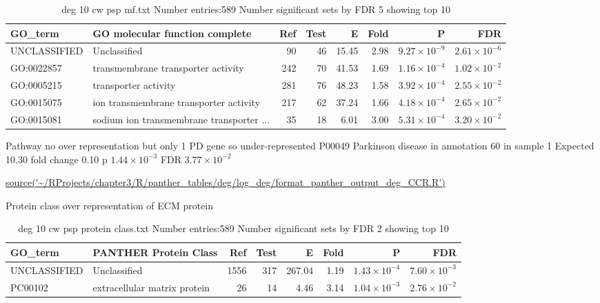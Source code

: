 \begin{table}[ht]
\centering
\begin{tabular}{llrrrrrr}
  \hline
GO\_term & GO molecular function complete & Ref & Test & E & Fold & P & FDR \\ 
  \hline
UNCLASSIFIED & Unclassified  & 90 & 46 & 15.45 & 2.98 & $9.27 \times 10^{-9}$ & $2.61 \times 10^{-6}$ \\ 
  GO:0022857 & transmembrane transporter activity  & 242 & 70 & 41.53 & 1.69 & $1.16 \times 10^{-4}$ & $1.02 \times 10^{-2}$ \\ 
  GO:0005215 & transporter activity  & 281 & 76 & 48.23 & 1.58 & $3.92 \times 10^{-4}$ & $2.55 \times 10^{-2}$ \\ 
  GO:0015075 & ion transmembrane transporter activity  & 217 & 62 & 37.24 & 1.66 & $4.18 \times 10^{-4}$ & $2.65 \times 10^{-2}$ \\ 
  GO:0015081 & sodium ion transmembrane transporter ... & 35 & 18 & 6.01 & 3.00 & $5.31 \times 10^{-4}$ & $3.20 \times 10^{-2}$ \\ 
  \hline
\end{tabular}
\caption{deg 10 cw psp mf.txt Number entries:589 Number significant sets by FDR 5 showing top 10} 
\label{tab:deg 10 cw psp mf.txt Number entries:589 Number significant sets by FDR 5 showing top 10}
\end{table}
 
 Pathway no over representation but only 1 PD gene so under-represented  P00049   Parkinson disease in annotation    60 in sample   1 Expected  10.30  fold change  0.10  p  $1.44 \times 10^{-3}$ FDR   $3.77 \times 10^{-2}$  
   
 \url{source('~/RProjects/chapter3/R/panther_tables/deg/log_deg/format_panther_output_deg_CCR.R')}
 
 Protein class over representation of ECM protein
 
 \begin{table}[ht]
\centering
\begin{tabular}{llrrrrrr}
  \hline
GO\_term & PANTHER Protein Class & Ref & Test & E & Fold & P & FDR \\ 
  \hline
UNCLASSIFIED & Unclassified  & 1556 & 317 & 267.04 & 1.19 & $1.43 \times 10^{-4}$ & $7.60 \times 10^{-3}$ \\ 
  PC00102 & extracellular matrix protein  & 26 & 14 & 4.46 & 3.14 & $1.04 \times 10^{-3}$ & $2.76 \times 10^{-2}$ \\ 
  \hline
\end{tabular}
\caption{deg 10 cw psp protein class.txt Number entries:589 Number significant sets by FDR 2 showing top 10} 
\label{tab:deg 10 cw psp protein class.txt Number entries:589 Number significant sets by FDR 2 showing top 10}
\end{table}

